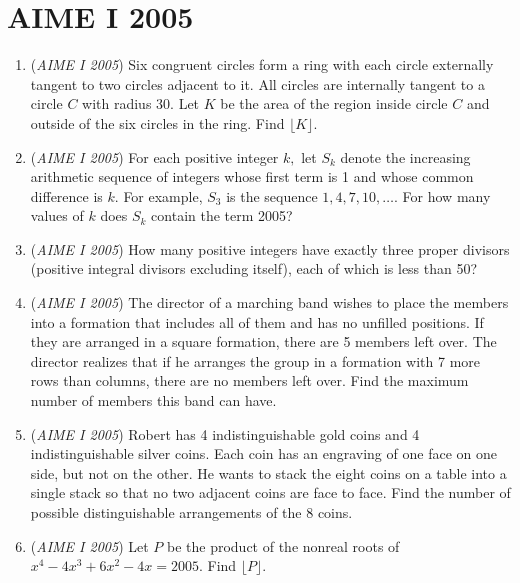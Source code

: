 \section{AIME I 2005}
        \begin{enumerate}
        	\item (\textit{AIME I 2005}) Six congruent circles form a ring with each circle externally tangent to two circles adjacent to it. All circles are internally tangent to a circle $C$ with radius 30. Let $K$ be the area of the region inside circle $C$ and outside of the six circles in the ring. Find $\lfloor K \rfloor.$


	\item (\textit{AIME I 2005}) For each positive integer $k,$ let $S_k$ denote the increasing arithmetic sequence of integers whose first term is 1 and whose common difference is $k.$ For example, $S_3$ is the sequence $1,4,7,10,\ldots.$ For how many values of $k$ does $S_k$ contain the term 2005?


 

	\item (\textit{AIME I 2005}) How many positive integers have exactly three proper divisors (positive integral divisors excluding itself), each of which is less than 50?


 

	\item (\textit{AIME I 2005}) The director of a marching band wishes to place the members into a formation that includes all of them and has no unfilled positions. If they are arranged in a square formation, there are 5 members left over. The director realizes that if he arranges the group in a formation with 7 more rows than columns, there are no members left over. Find the maximum number of members this band can have.


 

	\item (\textit{AIME I 2005}) Robert has 4 indistinguishable gold coins and 4 indistinguishable silver coins. Each coin has an engraving of one face on one side, but not on the other. He wants to stack the eight coins on a table into a single stack so that no two adjacent coins are face to face. Find the number of possible distinguishable arrangements of the 8 coins.


 

	\item (\textit{AIME I 2005}) Let $P$ be the product of the nonreal roots of $x^4-4x^3+6x^2-4x=2005.$ Find $\lfloor P\rfloor.$



\end{enumerate}
